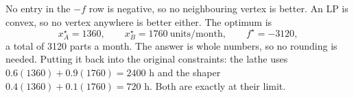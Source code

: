 \documentclass[11pt,a4paper]{article}
\begin{document}
No entry in the $-f$ row is negative, so no neighbouring vertex is better. An LP
is convex, so no vertex anywhere is better either. The optimum is
\[
  x_A^\star = 1360, \qquad x_B^\star = 1760 \ \text{units/month}, \qquad
  f^\star = -3120,
\]
a total of 3120 parts a month. The answer is whole numbers, so no rounding is
needed. Putting it back into the original constraints: the lathe uses
$0.6(1360) + 0.9(1760) = 2400$ h and the shaper $0.4(1360) + 0.1(1760) = 720$ h.
Both are exactly at their limit.






\end{document}
